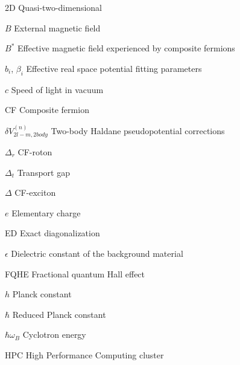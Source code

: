 \doublespacing

\begin{abbrv}
\item[2D] \hspace*{4.5mm} Quasi-two-dimensional
\item[$B$] \hspace*{4.5mm} External magnetic field
\item[$B^*$] \hspace*{4.5mm} Effective magnetic field experienced by composite fermions
\item[$b_i$, $\beta_i$] \hspace*{4.5mm} Effective real space potential fitting parameters
\item[$c$] \hspace*{4.5mm} Speed of light in vacuum
\item[CF] \hspace*{4.5mm} Composite fermion
\item[$\delta V^{(n)}_{2l-m,2body}$] \hspace*{4.5mm} Two-body Haldane pseudopotential corrections
\item[$\Delta_r$] \hspace*{4.5mm} CF-roton
\item[$\Delta_t$] \hspace*{4.5mm} Transport gap
\item[$\Delta$] \hspace*{4.5mm} CF-exciton
\item[$e$] \hspace*{4.5mm} Elementary charge
\item[ED] \hspace*{4.5mm} Exact diagonalization
\item[$\epsilon$] \hspace*{4.5mm} Dielectric constant of the background material
\item[FQHE] \hspace*{4.5mm} Fractional quantum Hall effect
\item[$h$] \hspace*{4.5mm} Planck constant
\item[$\hbar$] \hspace*{4.5mm} Reduced Planck constant
\item[$\hbar\omega_B$] \hspace*{4.5mm} Cyclotron energy
\item[HPC] \hspace*{4.5mm} High Performance Computing cluster

\end{abbrv}
